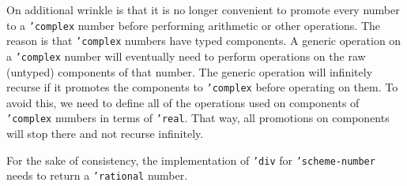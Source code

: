 \documentclass{article}
\begin{document}
On additional wrinkle is that it is no longer convenient to promote every
number to a \texttt{'complex} number before performing arithmetic or other
operations. The reason is that \texttt{'complex} numbers have typed components.
A generic operation on a \texttt{'complex} number will eventually need to
perform operations on the raw (untyped) components of that number. The generic
operation will infinitely recurse if it promotes the components to
\texttt{'complex} before operating on them. To avoid this, we need to define
all of the operations used on components of \texttt{'complex} numbers in terms
of \texttt{'real}. That way, all promotions on components will stop there and
not recurse infinitely.

For the sake of consistency, the implementation of \texttt{'div} for
\texttt{'scheme-number} needs to return a \texttt{'rational} number.



\end{document}

